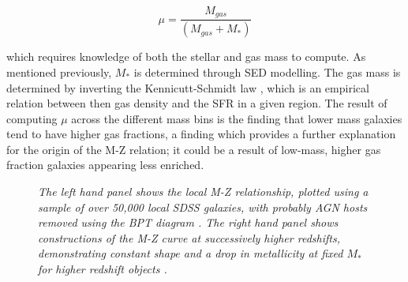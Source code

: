 \documentclass{literature}
\begin{document}
\begin{equation}\label{eq:gas_fraction}
	\mu = \frac{M_{gas}}{(M_{gas} + M_{*})}
\end{equation}

which requires knowledge of both the stellar and gas mass to compute. As mentioned previously, $M_{*}$ is determined through SED modelling. The gas mass is determined by inverting the Kennicutt-Schmidt law \citep{Kennicutt1998}, which is an empirical relation between then gas density and the SFR in a given region. The result of computing $\mu$ across the different mass bins is the finding that lower mass galaxies tend to have higher gas fractions, a finding which provides a further explanation for the origin of the M-Z relation; it could be a result of low-mass, higher gas fraction galaxies appearing less enriched.  
 \\ 
\begin{figure}[!htp]
\centering
{}
\caption{\footnotesize{\emph{The left hand panel shows the local M-Z relationship, plotted using a sample of over 50,000 local SDSS galaxies, with probably AGN hosts removed using the BPT diagram \citep{Tremonti2004}. The right hand panel shows constructions of the M-Z curve at successively higher redshifts, demonstrating constant shape and a drop in metallicity at fixed $M_{*}$ for higher redshift objects \citep{Maiolino2008}.}}}
\label{fig:steidel_mzr}
\end{figure}
\end{document}
